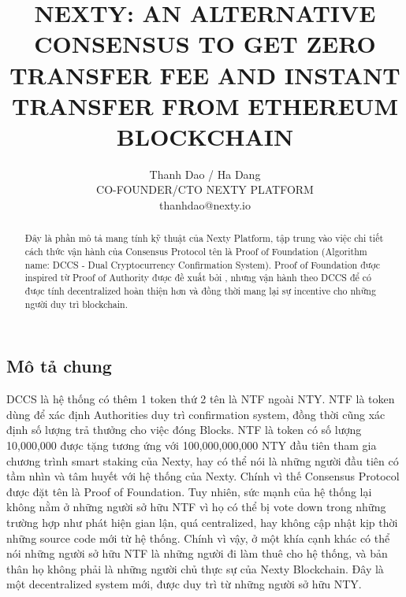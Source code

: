 \documentclass[12pt]{amsart}
\title{NEXTY: AN ALTERNATIVE CONSENSUS TO GET ZERO TRANSFER FEE AND INSTANT TRANSFER FROM ETHEREUM BLOCKCHAIN}
\author{
	Thanh Dao / Ha Dang \\
	CO-FOUNDER/CTO NEXTY PLATFORM \\
	thanhdao@nexty.io
}
\date{} %
\begin{document}
\pagecolor{pagecolor}
\begin{abstract}
Đây là phần mô tả mang tính kỹ thuật của Nexty Platform, tập trung vào việc chi tiết cách thức vận hành của Consensus Protocol tên là Proof of Foundation (Algorithm name: DCCS - Dual Cryptocurrency Confirmation System). Proof of Foundation được inspired từ Proof of Authority được đề xuất bởi \cite{clique}, nhưng vận hành theo DCCS để có được tính decentralized hoàn thiện hơn và đồng thời mang lại sự incentive cho những người duy trì blockchain.
\end{abstract}

\maketitle

\setlength{\columnsep}{20pt}
\begin{multicols}{2}

\section{Mô tả chung}\label{sec:introduction}
DCCS là hệ thống có thêm 1 token thứ 2 tên là NTF ngoài NTY. NTF là token dùng để xác định Authorities duy trì confirmation system, đồng thời cũng xác định số lượng trả thưởng cho việc đóng Blocks. NTF là token có số lượng 10,000,000 được tặng tương ứng với 100,000,000,000 NTY đầu tiên tham gia chương trình smart staking của Nexty, hay có thể nói là những người đầu tiên có tầm nhìn và tâm huyết với hệ thống của Nexty. Chính vì thế Consensus Protocol được đặt tên là Proof of Foundation. Tuy nhiên, sức mạnh của hệ thống lại không nằm ở những người sở hữu NTF vì họ có thể bị vote down trong những trường hợp như phát hiện gian lận, quá centralized, hay không cập nhật kịp thời những source code mới từ hệ thống. Chính vì vậy, ở một khía cạnh khác có thể nói những người sở hữu NTF là những người đi làm thuê cho hệ thống, và bản thân họ không phải là những người chủ thực sự của Nexty Blockchain. Đây là một decentralized system mới, được duy trì từ những người sở hữu NTY.


\end{multicols}
\end{document}
